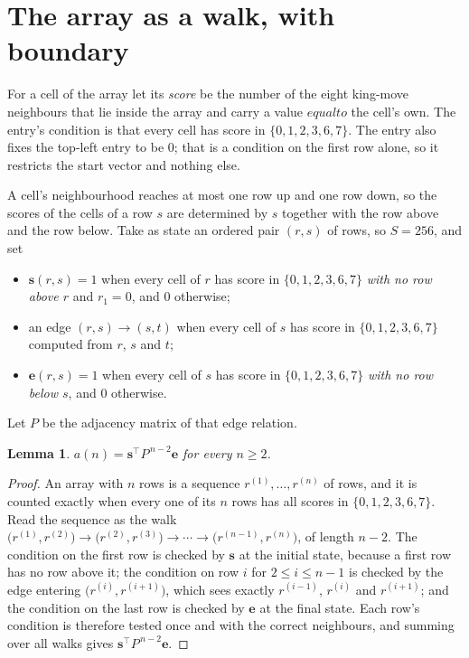 \documentclass[11pt,a4paper]{article}
\theoremstyle{plain}
\newtheorem{lemma}[theorem]{Lemma}
\theoremstyle{definition}
\begin{document}
\section{The array as a walk, with boundary}

For a cell of the array let its \emph{score} be the number of the eight king-move neighbours that lie inside
the array and carry a value $equal to$ the cell's own. The entry's condition is that every cell
has score in $\{0,1,2,3,6,7\}$. The entry also fixes the top-left entry to be $0$; that is a condition on the first row alone, so it restricts the start vector and nothing else.

A cell's neighbourhood reaches at most one row up and one row down, so the scores of the
cells of a row $s$ are determined by $s$ together with the row above and the row below.
Take as state an ordered pair $(r,s)$ of rows, so $S=256$, and set
\begin{itemize}
\item $\mathbf{s}(r,s)=1$ when every cell of $r$ has score in $\{0,1,2,3,6,7\}$ \emph{with no row
above $r$} and $r_1=0$, and $0$ otherwise;
\item an edge $(r,s)\to(s,t)$ when every cell of $s$ has score in $\{0,1,2,3,6,7\}$ computed from
$r$, $s$ and $t$;
\item $\mathbf{e}(r,s)=1$ when every cell of $s$ has score in $\{0,1,2,3,6,7\}$ \emph{with no row
below $s$}, and $0$ otherwise.
\end{itemize}
Let $P$ be the adjacency matrix of that edge relation.

\begin{lemma}\label{lem:walk}
$a(n)=\mathbf{s}^{\!\top}P^{\,n-2}\mathbf{e}$ for every $n\ge2$.
\end{lemma}

\begin{proof}
An array with $n$ rows is a sequence $r^{(1)},\dots,r^{(n)}$ of rows, and it is counted
exactly when every one of its $n$ rows has all scores in $\{0,1,2,3,6,7\}$. Read the sequence as the
walk $\bigl(r^{(1)},r^{(2)}\bigr)\to\bigl(r^{(2)},r^{(3)}\bigr)\to\cdots\to
\bigl(r^{(n-1)},r^{(n)}\bigr)$, of length $n-2$. The condition on the first row is
checked by $\mathbf{s}$ at the initial state, because a first row has no row above it; the
condition on row $i$ for $2\le i\le n-1$ is checked by the edge entering
$\bigl(r^{(i)},r^{(i+1)}\bigr)$, which sees exactly $r^{(i-1)}$, $r^{(i)}$ and
$r^{(i+1)}$; and the condition on the last row is checked by $\mathbf{e}$ at the final
state. Each row's condition is therefore tested once and with the correct neighbours, and
summing over all walks gives $\mathbf{s}^{\!\top}P^{\,n-2}\mathbf{e}$.
\end{proof}
\end{document}
